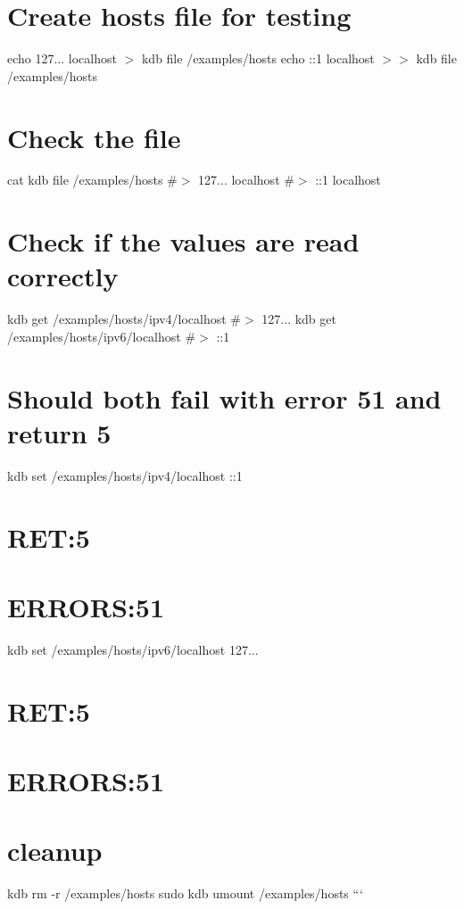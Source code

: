 \section*{Create hosts file for testing}

echo \textquotesingle{}127... localhost\textquotesingle{} $>$ {\ttfamily kdb file /examples/hosts} echo \textquotesingle{}\+:\+:1 localhost\textquotesingle{} $>$$>$ {\ttfamily kdb file /examples/hosts}

\section*{Check the file}

cat {\ttfamily kdb file /examples/hosts} \#$>$ 127... localhost \#$>$ \+:\+:1 localhost

\section*{Check if the values are read correctly}

kdb get /examples/hosts/ipv4/localhost \#$>$ 127... kdb get /examples/hosts/ipv6/localhost \#$>$ \+:\+:1

\section*{Should both fail with error 51 and return 5}

kdb set /examples/hosts/ipv4/localhost \+:\+:1 \section*{R\+ET\+:5}

\section*{E\+R\+R\+O\+RS\+:51}

kdb set /examples/hosts/ipv6/localhost 127... \section*{R\+ET\+:5}

\section*{E\+R\+R\+O\+RS\+:51}

\section*{cleanup}

kdb rm -\/r /examples/hosts sudo kdb umount /examples/hosts ``` 